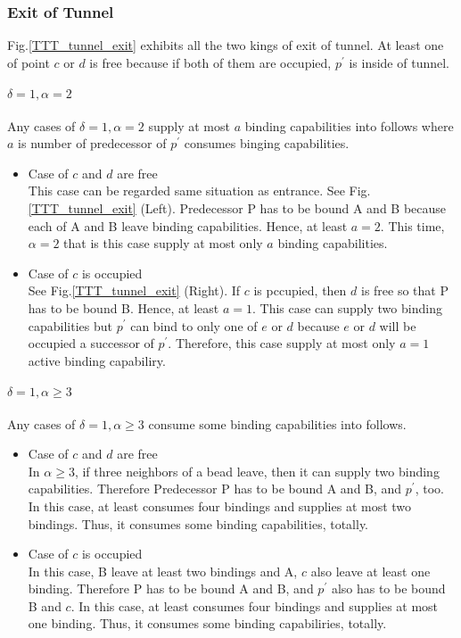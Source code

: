 \documentclass[runningheads]{llncs}
\begin{document}
\subsubsection{Exit of Tunnel}


Fig.\ref{TTT_tunnel_exit} exhibits all the two kings of exit of tunnel. 
At least one of point $c$ or $d$ is free because if both of them are occupied, $p^\prime$ is inside of tunnel.

\paragraph{$\delta = 1, \alpha = 2$}
 Any cases of $\delta = 1, \alpha = 2$ supply at most $a$ binding capabilities into follows where $a$ is number of predecessor of $p^\prime$ consumes binging capabilities.

\begin{itemize}
\item{Case of $c$ and $d$ are free}\\
  This case can be regarded same situation as entrance. See Fig.\ref{TTT_tunnel_exit} (Left). Predecessor P has to be bound A and B because each of A and B leave binding capabilities. Hence, at least $a=2$. This time, $\alpha = 2$ that is this case supply at most only $a$ binding capabilities.
  
\item{Case of $c$ is occupied}\\
  See Fig.\ref{TTT_tunnel_exit} (Right). If $c$ is pccupied, then $d$ is free so that P has to be bound B. Hence, at least $a=1$. This case can supply two binding capabilities but $p^\prime$ can bind to only one of $e$ or $d$ because $e$ or $d$ will be occupied a successor of $p^\prime$. Therefore, this case supply at most only $a=1$ active binding capabiliry.
  
\end{itemize}

\paragraph{$\delta = 1, \alpha \geq 3$}
Any cases of $\delta = 1, \alpha \geq 3$ consume some binding capabilities into follows.

\begin{itemize}
\item{Case of $c$ and $d$ are free}\\
  In $\alpha \geq 3$, if three neighbors of a bead leave, then it can supply two binding capabilities. Therefore Predecessor P has to be bound A and B, and $p^\prime$, too. In this case, at least consumes four bindings and supplies at most two bindings. Thus, it consumes some binding capabilities, totally.
  
\item{Case of $c$ is occupied}\\
  In this case, B leave at least two bindings and A, $c$ also leave at least one binding. Therefore P has to be bound A and B, and $p^\prime$ also has to be bound B and $c$. In this case, at least consumes four bindings and supplies at most one binding. Thus, it consumes some binding capabiliries, totally.
\end{itemize}
\end{document}
